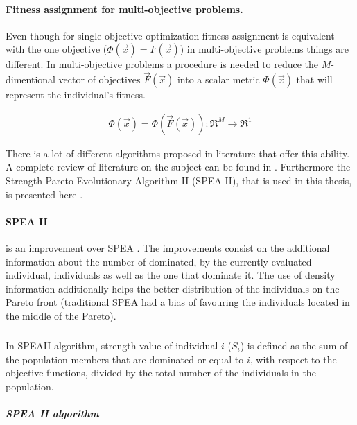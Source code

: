 \paragraph{Fitness assignment for multi-objective problems.}
Even though for single-objective optimization fitness assignment is equivalent with the one objective ($\Phi(\vec{x})=F(\vec{x})$) in multi-objective problems things are different. In multi-objective problems a procedure is needed to reduce the $M$-dimentional vector of objectives $\vec{F}(\vec{x})$ into a scalar metric $\Phi(\vec{x})$ that will represent the individual's fitness. 

\begin{eqnarray}
    \Phi(\vec{x})=\Phi(\vec{F}(\vec{x})) :\Re ^M \rightarrow \Re ^1 
\end{eqnarray}

There is a lot of different algorithms proposed in literature that offer this ability. A complete review of literature on the subject can be found in \cite{CoCo99,coe02,Miett99}. Furthermore the Strength Pareto Evolutionary Algorithm II (SPEA II), that is used in this thesis, is presented here \cite{Zitz01,Zitz02}.

\paragraph{SPEA II}
is an improvement over SPEA \cite{ZiTh98}. The improvements consist on the additional information about the number of dominated, by the currently evaluated individual, individuals as well as the one that dominate it. The use of density information additionally helps the better distribution of the individuals on the Pareto front (traditional SPEA had a bias of favouring the individuals located in the middle of the Pareto). 

\subparagraph{} In SPEAII algorithm, strength value of individual $i$ ($S_i$) is defined as the sum of the population members that are dominated or equal to $i$, with respect to the objective functions, divided by the total number of the individuals in the population.  


\subparagraph{SPEA II algorithm}

